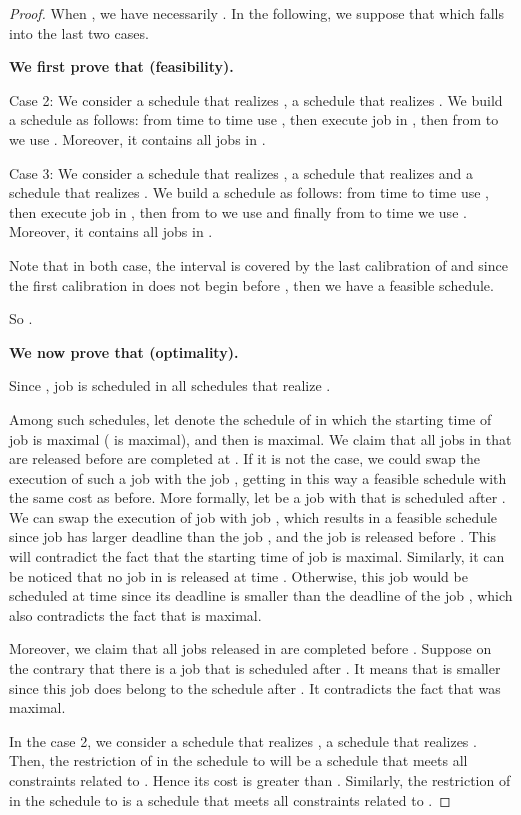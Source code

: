 \begin{proof}
When , we have necessarily . In the following, we suppose that  which falls into the last two cases. 


\noindent
\textbf{We first prove that  (feasibility).}

Case 2: We consider a schedule  that realizes , a schedule  that realizes  . We build a schedule as follows: from time  to time  use , then execute job  in , then from   to  we use . Moreover, it contains all jobs in . 

Case 3: We consider a schedule  that realizes , a schedule  that realizes   and a schedule  that realizes . We build a schedule as follows: from time  to time  use , then execute job  in , then from   to  we use  and finally from   to time  we use . Moreover, it contains all jobs in . 

Note that in both case, the interval  is covered by the last calibration of  and since the first calibration in  does not begin before , then we have a feasible schedule.

So .


\noindent
\textbf{We now prove that  (optimality).}

Since , job  is scheduled in all schedules that realize .

Among such schedules, let  denote the schedule of  in which the starting time of job  is maximal ( is maximal), and then  is maximal. We claim that all jobs in  that are released before  are completed at . If it is not the case, we could swap the execution of such a job with the job , getting in this way a feasible schedule with the same cost as before. More formally, let  be a job with  that is scheduled after . We can swap the execution of job  with job , which results in a feasible schedule since job  has larger deadline than the job , and the job  is released before . This will contradict the fact that the starting time of job  is maximal.
Similarly, it can be noticed that no job in  is released at time . Otherwise, this job would be scheduled at time  since its deadline is smaller than the deadline of the job , which also contradicts the fact that  is maximal.



Moreover, we claim that all jobs released in  are completed before . Suppose on the contrary that there is a job  that is scheduled after . It means that  is smaller since this job does belong to the schedule after . It contradicts the fact that  was maximal. 


In the case 2, we consider a schedule  that realizes , a schedule  that realizes . Then, the restriction of  in the schedule  to  will be a schedule that meets all constraints related to . Hence its cost is greater than . Similarly, the restriction of  in the schedule  to  is a schedule that meets all constraints related to .


\end{proof}
